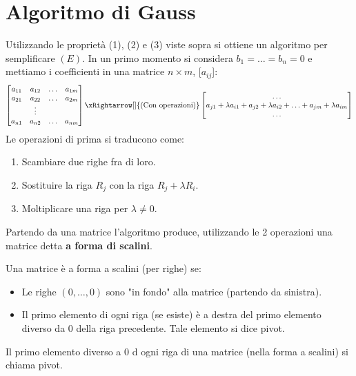 \newpage
\section{Algoritmo di Gauss}
Utilizzando le proprietà (1), (2) e (3) viste sopra si ottiene un algoritmo per semplificare $(E)$.
In un primo momento si considera $b_1 = \ldots = b_n = 0$ e mettiamo i coefficienti in una matrice $n \times m$, [$a_{ij}$]:
\[
\begin{bmatrix}
a_{11} & a_{12} & \ldots & a_{1m}\\
a_{21} & a_{22} & \ldots & a_{2m}\\
& \vdots & & \\
a_{n1} & a_{n2} & \ldots & a_{nm}
\end{bmatrix}
\xRightarrow[]{\text{(Con operazioni)}}
\begin{bmatrix}
\ldots \\
a_{j1} + \lambda a_{i1} + a_{j2} + \lambda a_{i2} + \ldots + a_{jm} + \lambda a_{im}\\
\ldots
\end{bmatrix}
\]
Le operazioni di prima si traducono come:
\begin{enumerate}
    \item Scambiare due righe fra di loro.
    \item Sostituire la riga $R_j$ con la riga $R_j + \lambda R_i$.
    \item Moltiplicare una riga per $\lambda \neq 0$.
\end{enumerate}
Partendo da una matrice l'algoritmo produce, utilizzando le 2 operazioni una matrice detta \textbf{a forma di scalini}.

\begin{definition}
Una matrice è a forma a scalini (per righe) se:
\begin{itemize}
    \item Le righe $(0,\ldots,0)$ sono "in fondo" alla matrice (partendo da sinistra).
    \item Il primo elemento di ogni riga (se esiste) è a destra del primo elemento diverso da 0 della riga precedente. Tale elemento si dice pivot.
\end{itemize}
\end{definition}

\begin{definition}[Pivot]
Il primo elemento diverso a 0 d ogni riga di una matrice (nella forma a scalini) si chiama pivot.
\end{definition}

